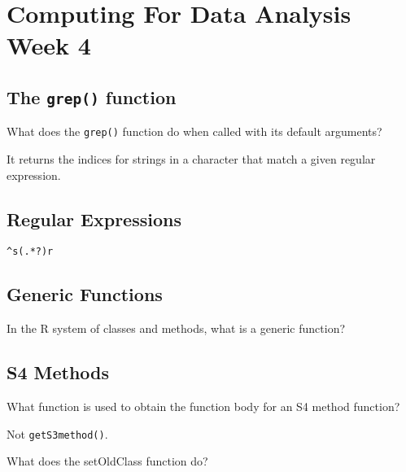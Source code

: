 \documentclass[11pt]{article} %
\begin{document}
\tableofcontents
\newpage
\section{Computing For Data Analysis Week 4}

\subsection{The \texttt{grep()} function }
 What does the \texttt{grep()} function do when called with its default arguments?
 
 It returns the indices for strings in a character that match a given regular expression.

\subsection{Regular Expressions}
\begin{framed}
\begin{verbatim}
^s(.*?)r
\end{verbatim}
\end{framed}
\subsection{Generic Functions}
In the R system of classes and methods, what is a generic function?


\subsection{S4 Methods}
What function is used to obtain the function body for an S4 method function?

Not \texttt{getS3method()}. 

What does the setOldClass function do?
\end{document}
